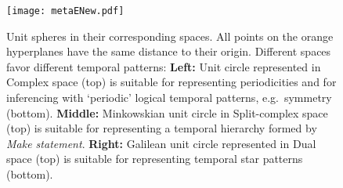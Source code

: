 \documentclass[letterpaper]{article} %
\begin{document}
\begin{figure}[t]
    \centering
    \texttt{[image: metaENew.pdf]}
    \caption{
    Unit spheres in their corresponding spaces. All points on the orange hyperplanes have the same distance to their origin. Different spaces favor different temporal patterns: 
    \textbf{Left:} Unit circle represented in Complex space (top) is suitable for representing periodicities and for inferencing with `periodic' logical temporal patterns, e.g.\ symmetry (bottom). 
    \textbf{Middle:} Minkowskian unit circle  in Split-complex space (top) is suitable for representing a temporal hierarchy formed by \textit{Make statement}.
    \textbf{Right:} Galilean unit circle represented in Dual space (top) is suitable for representing temporal star patterns (bottom).
    }
    \label{fig:baseMotivExamp}
\end{figure}
\end{document}
